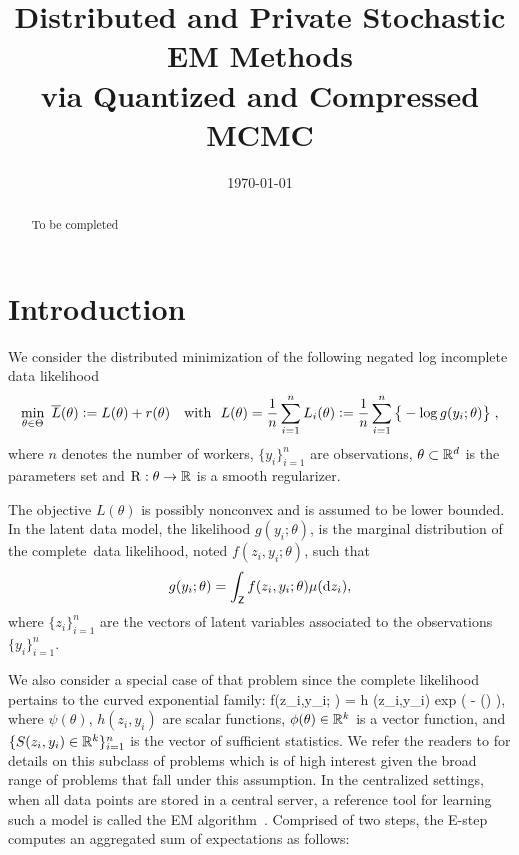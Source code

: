 \documentclass[11pt]{article}
\theoremstyle{t}
\begin{document}
\title{Distributed and Private Stochastic EM Methods\\
via Quantized and Compressed MCMC}
\date{\today}

\maketitle

\begin{abstract}
To be completed
\end{abstract}


\section{Introduction}

We consider the distributed minimization of the following negated log incomplete data likelihood 
\begin{align} \label{eq:em_motivate}
\begin{split} 
 \min_{ \theta \in \Theta }~ \overline{L} ( \theta ) \mathrel{\mathop:}=  L ( \theta ) + r (\theta) \quad \text{with}~~L(\theta) = \frac{1}{n} \sum_{i=1}^n L_i( \theta) \mathrel{\mathop:}=  \frac{1}{n} \sum_{i=1}^n \big\{ - \log g( y_i ; \theta ) \big\}\;,
\end{split} 
\end{align}
where $n$ denotes the number of workers, $\{y_i\}_{i=1}^n$ are observations, $\theta \subset \mathbb{R}^d$ is the parameters set and $\operatorname{R} : \theta \rightarrow \mathbb{R}$ is a smooth regularizer.

The objective  $L( \theta )$ is possibly {nonconvex} and is assumed to be lower bounded. 
In the latent data model, the likelihood $g(y_i ; \theta)$, is the marginal distribution of the complete~data likelihood, noted $f(z_i,y_i; \theta)$, such that 
\begin{align}
g(y_i; \theta) = \int_{\mathsf{Z}} f (z_i,y_i;\theta) \mu(\mathrm d z_i),    
\end{align}
where $\{ z_i \}_{i=1}^n$ are the vectors of latent variables associated to the observations $\{y_i\}_{i=1}^n$.

We also consider a special case of that problem since the complete likelihood pertains to the curved exponential family:
\beq \label{eq:exp}
f(z_i,y_i; \theta) = h  (z_i,y_i) \textrm{exp} (  - \psi(\theta) )\eqs,
\eeq
where $\psi(\theta)$, $h(z_i,y_i)$ are scalar functions, $\phi(\theta) \in \mathbb{R}^k$ is a vector function, and $\{S(z_i,y_i) \in \mathbb{R}^k\}_{i=1}^n$ is the vector of sufficient statistics.
We refer the readers to \citep{efron1975defining} for details on this subclass of problems which is of high interest given the broad range of problems that fall under this assumption.
In the centralized settings, \ie when all data points are stored in a central server, a reference tool for learning such a model is called the EM algorithm~\citep{dempster1977Maximum, wu1983convergence}. Comprised of two steps, the E-step computes an aggregated sum of expectations as follows:
\end{document}
